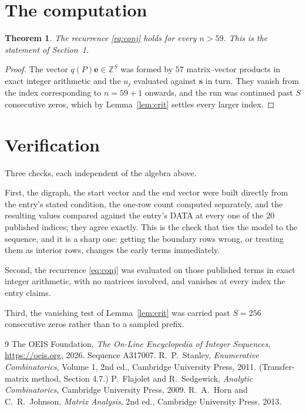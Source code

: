 \documentclass[11pt,a4paper]{article}
\theoremstyle{plain}
\newtheorem{theorem}{Theorem}
\theoremstyle{definition}
\begin{document}
\section{The computation}

\begin{theorem}
The recurrence \eqref{eq:conj} holds for every $n>59$. This is the statement of
Section~1.
\end{theorem}

\begin{proof}
The vector $q(P)\mathbf{e}\in\mathbb{Z}^{S}$ was formed by $57$ matrix--vector
products in exact integer arithmetic and the $u_j$ evaluated against $\mathbf{s}$ in turn.
They vanish from the index corresponding to $n=59+1$ onwards, and the run was continued
past $S$ consecutive zeros, which by Lemma~\ref{lem:crit} settles every larger index.
\end{proof}

\section{Verification}

Three checks, each independent of the algebra above.

First, the digraph, the start vector and the end vector were built directly from the
entry's stated condition, the one-row count computed separately, and the resulting values
compared against the entry's DATA at every one of the $20$ published indices; they
agree exactly. This is the check that ties the model to the sequence, and it is a sharp one:
getting the boundary rows wrong, or treating them as interior rows, changes the early terms
immediately.

Second, the recurrence \eqref{eq:conj} was evaluated on those published terms in exact
integer arithmetic, with no matrices involved, and vanishes at every index the entry claims.

Third, the vanishing test of Lemma~\ref{lem:crit} was carried past $S=256$ consecutive
zeros rather than to a sampled prefix.

\begin{thebibliography}{9}
 The OEIS Foundation, \emph{The On-Line Encyclopedia of Integer
Sequences}, \url{https://oeis.org}, 2026. Sequence A317007.
 R.~P.~Stanley, \emph{Enumerative Combinatorics}, Volume 1, 2nd ed.,
Cambridge University Press, 2011. (Transfer-matrix method, Section 4.7.)
 P.~Flajolet and R.~Sedgewick, \emph{Analytic Combinatorics}, Cambridge
University Press, 2009.
 R.~A.~Horn and C.~R.~Johnson, \emph{Matrix Analysis}, 2nd ed., Cambridge
University Press, 2013.
\end{thebibliography}
\end{document}
